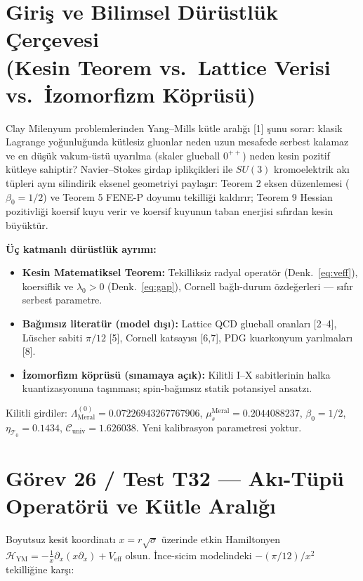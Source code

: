 \documentclass[12pt,a4paper]{article}
\begin{document}
\section[Giriş ve Bilimsel Dürüstlük Çerçevesi]{Giriş ve Bilimsel Dürüstlük Çerçevesi \\ (Kesin Teorem vs.\ Lattice Verisi vs.\ İzomorfizm Köprüsü)}

Clay Milenyum problemlerinden Yang--Mills kütle aralığı [1] şunu sorar: klasik
Lagrange yoğunluğunda kütlesiz gluonlar neden uzun mesafede serbest kalamaz ve
en düşük vakum-üstü uyarılma (skaler glueball $0^{++}$) neden kesin pozitif
kütleye sahiptir? Navier--Stokes girdap iplikçikleri ile $SU(3)$ kromoelektrik
akı tüpleri aynı silindirik eksenel geometriyi paylaşır: Teorem 2 eksen
düzenlemesi ($\beta_0=1/2$) ve Teorem 5 FENE-P doyumu tekilliği kaldırır;
Teorem 9 Hessian pozitivliği koersif kuyu verir ve koersif kuyunun taban enerjisi
sıfırdan kesin büyüktür.

\textbf{Üç katmanlı dürüstlük ayrımı:}
\begin{itemize}
    \item \textbf{Kesin Matematiksel Teorem:} Tekilliksiz radyal operatör
    (Denk.~\ref{eq:veff}), koersiflik ve $\lambda_0>0$ (Denk.~\ref{eq:gap}),
    Cornell bağlı-durum özdeğerleri --- sıfır serbest parametre.
    \item \textbf{Bağımsız literatür (model dışı):} Lattice QCD glueball
    oranları [2--4], Lüscher sabiti $\pi/12$ [5], Cornell katsayısı [6,7],
    PDG kuarkonyum yarılmaları [8].
    \item \textbf{İzomorfizm köprüsü (sınamaya açık):} Kilitli I--X
    sabitlerinin halka kuantizasyonuna taşınması; spin-bağımsız statik
    potansiyel ansatzı.
\end{itemize}
Kilitli girdiler: $\Lambda_{\mathrm{Meral}}^{(0)} = 0.07226943267767906$,
$\mu_s^{\mathrm{Meral}} = 0.2044088237$, $\beta_0 = 1/2$,
$\eta_{\mathcal{T}_0} = 0.1434$,
$\mathcal{C}_{\mathrm{univ}} = 1.626038$. Yeni kalibrasyon parametresi yoktur.

\section{Görev 26 / Test T32 --- Akı-Tüpü Operatörü ve Kütle Aralığı}

Boyutsuz kesit koordinatı $x=r\sqrt{\sigma}$ üzerinde etkin Hamiltonyen
$\mathcal{H}_{\mathrm{YM}}=-\frac{1}{x}\partial_x(x\partial_x)+V_{\mathrm{eff}}$
olsun. İnce-sicim modelindeki $-(\pi/12)/x^2$ tekilliğine karşı:
\end{document}
